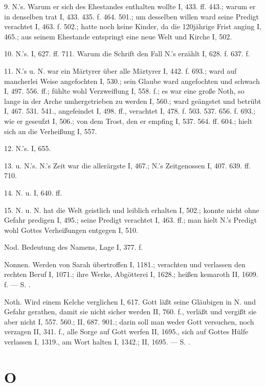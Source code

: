 9.  N.’s. Warum er sich des Ehestandes enthalten wollte I, 433. ff. 443.; warum er in denselben trat I, 433. 435. f. 464. 501.; um desselben willen ward seine Predigt verachtet I, 463. f. 502.; hatte noch keine Kinder, da die 120jährige Frist anging I, 465.; aus seinem Ehestande entspringt eine neue Welt und Kirche I, 502.

10.  N.’s. I, 627. ff. 711. Warum die Schrift den Fall N.’s erzählt I, 628. f. 637. f.

11. N.’s  u.  N. war ein Märtyrer über alle Märtyrer I, 442. f. 693.; ward auf mancherlei Weise angefochten I, 530.; sein Glaube ward angefochten und schwach I, 497. 556. ff.; fühlte wohl Verzweiflung I, 558. f.; es war eine große Noth, so lange in der Arche umhergetrieben zu werden I, 560.; ward geängstet und betrübt I, 467. 531. 541., angefeindet I, 498. ff., verachtet I, 478. f. 503. 537. 656. f. 693.; wie er geseufzt I, 506.; von dem Trost, den er empfing I, 537. 564. ff. 604.; hielt sich an die Verheißung I, 557.

12.  N.’s. I, 655.

13.  u.  N.’s. N.’s Zeit war die allerärgste I, 467.; N.’s Zeitgenossen I, 407. 639. ff. 710.

14. N. u.  I, 640. ff.

15. N. u.  N. hat die Welt geistlich und leiblich erhalten I, 502.; konnte nicht ohne Gefahr predigen I, 495.; seine Predigt verachtet I, 463. ff.; man hielt N.’s Predigt wohl Gottes Verheißungen entgegen I, 510.

Nod. Bedeutung des Namens, Lage I, 377. f.

Nonnen. Werden von Sarah übertroffen I, 1181.; verachten und verlassen den rechten Beruf I, 1071.; ihre Werke, Abgötterei I, 1628.; heißen kemaroth II, 1609. f. — S. .

Noth. Wird einem Kelche verglichen I, 617. Gott läßt seine Gläubigen in N. und Gefahr gerathen, damit sie nicht sicher werden II, 760. f., verläßt und vergißt sie aber nicht I, 557. 560.; II, 687. 901.; darin soll man weder Gott versuchen, noch verzagen II, 341. f., alle Sorge auf Gott werfen II, 1695., sich auf Gottes Hülfe verlassen I, 1319., am Wort halten I, 1342.; II, 1695. — S. .

\section{O}

